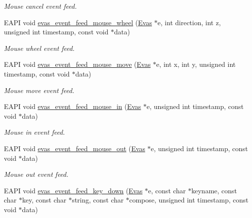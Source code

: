 \begin{DoxyCompactItemize}
\begin{DoxyCompactList}\small\item\em Mouse cancel event feed. \item\end{DoxyCompactList}\item 
EAPI void \hyperlink{group__Evas__Event__Feeding__Group_ga393156722bbe1ce384f0ab33ab76a1f2}{evas\_\-event\_\-feed\_\-mouse\_\-wheel} (\hyperlink{group__Evas__Canvas_ga5ff87cc4ce6bc43e3b640a6d37f73043}{Evas} $\ast$e, int direction, int z, unsigned int timestamp, const void $\ast$data)
\begin{DoxyCompactList}\small\item\em Mouse wheel event feed. \item\end{DoxyCompactList}\item 
EAPI void \hyperlink{group__Evas__Event__Feeding__Group_ga480017cad2b8982bee7a894433aff2f7}{evas\_\-event\_\-feed\_\-mouse\_\-move} (\hyperlink{group__Evas__Canvas_ga5ff87cc4ce6bc43e3b640a6d37f73043}{Evas} $\ast$e, int x, int y, unsigned int timestamp, const void $\ast$data)
\begin{DoxyCompactList}\small\item\em Mouse move event feed. \item\end{DoxyCompactList}\item 
EAPI void \hyperlink{group__Evas__Event__Feeding__Group_gac9c7fada70cfee1f8124ab5446cc59ed}{evas\_\-event\_\-feed\_\-mouse\_\-in} (\hyperlink{group__Evas__Canvas_ga5ff87cc4ce6bc43e3b640a6d37f73043}{Evas} $\ast$e, unsigned int timestamp, const void $\ast$data)
\begin{DoxyCompactList}\small\item\em Mouse in event feed. \item\end{DoxyCompactList}\item 
EAPI void \hyperlink{group__Evas__Event__Feeding__Group_ga64f5f2d26a018f4e6154b91251e6bb13}{evas\_\-event\_\-feed\_\-mouse\_\-out} (\hyperlink{group__Evas__Canvas_ga5ff87cc4ce6bc43e3b640a6d37f73043}{Evas} $\ast$e, unsigned int timestamp, const void $\ast$data)
\begin{DoxyCompactList}\small\item\em Mouse out event feed. \item\end{DoxyCompactList}\item 
EAPI void \hyperlink{group__Evas__Event__Feeding__Group_ga096e2ef05bfa471d2773729bd24732a0}{evas\_\-event\_\-feed\_\-key\_\-down} (\hyperlink{group__Evas__Canvas_ga5ff87cc4ce6bc43e3b640a6d37f73043}{Evas} $\ast$e, const char $\ast$keyname, const char $\ast$key, const char $\ast$string, const char $\ast$compose, unsigned int timestamp, const void $\ast$data)

\end{DoxyCompactItemize}
